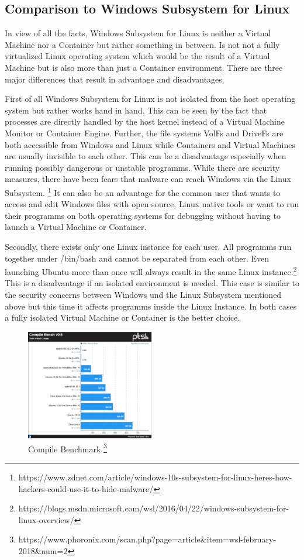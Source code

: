 \documentclass[utf8,biblatex]{lni}
\begin{document}
\subsection{Comparison to Windows Subsystem for Linux}

In view of all the facts, Windows Subsystem for Linux is neither a Virtual Machine nor a Container but rather something in between. Is not not a fully virtualized Linux operating system which would be the result of a Virtual Machine but is also more than just a Container environment. There are three major differences that result in advantage and disadvantages. 

First of all Windows Subsystem for Linux is not isolated from the host operating system but rather works hand in hand. This can be seen by the fact that processes are directly handled by the host kernel instead of a Virtual Machine Monitor or Container Engine. Further, the file systems VolFs and DriveFs are both accessible from Windows and Linux while Containers and Virtual Machines are usually invisible to each other. This can be a disadvantage especially when running possibly dangerous or unstable programms. While there are security measures, there have been fears that malware can reach Windows via the Linux Subsystem. \footnote{https://www.zdnet.com/article/windows-10s-subsystem-for-linux-heres-how-hackers-could-use-it-to-hide-malware/} It can also be an advantage for the common user that wants to access and edit Windows files with open source, Linux native tools or want to run their programms on both operating systems for debugging without having to launch a Virtual Machine or Container.

Secondly, there exists only one Linux instance for each user. All programms run together under /bin/bash and cannot be separated from each other. Even launching Ubuntu more than once will always result in the same Linux instance.\footnote{https://blogs.msdn.microsoft.com/wsl/2016/04/22/windows-subsystem-for-linux-overview/} This is a disadvantage if an isolated environment is needed. This case is similar to the security concerns between Windows und the Linux Subsystem mentioned above but this time it affects programms inside the Linux Instance. In both cases a fully isolated Virtual Machine or 
Container is the better choice.

\begin{figure}
  \centering
  \includegraphics[width=0.5\textwidth]{CompileSpeed.pdf}
  \caption{Compile Benchmark \footnote{https://www.phoronix.com/scan.php?page=article&item=wsl-february-2018&num=2}}
  \label{img:container}
\end{figure}
\end{document}

